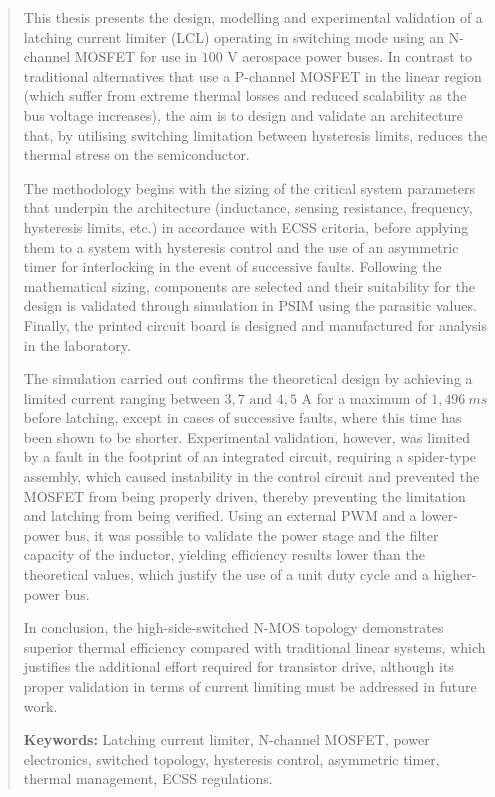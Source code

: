 \documentclass[12pt]{report} %
\begin{document}
\renewcommand\abstractname{\large\bfseries\filcenter\uppercase{Abstract}}
\begin{abstract}
\thispagestyle{plain}
This thesis presents the design, modelling and experimental validation of a latching current limiter (LCL) operating in switching mode using an N-channel MOSFET for use in $100\text{ V}$ aerospace power buses. In contrast to traditional alternatives that use a P-channel MOSFET in the linear region (which suffer from extreme thermal losses and reduced scalability as the bus voltage increases), the aim is to design and validate an architecture that, by utilising switching limitation between hysteresis limits, reduces the thermal stress on the semiconductor.

The methodology begins with the sizing of the critical system parameters that underpin the architecture (inductance, sensing resistance, frequency, hysteresis limits, etc.) in accordance with ECSS criteria, before applying them to a system with hysteresis control and the use of an asymmetric timer for interlocking in the event of successive faults. Following the mathematical sizing, components are selected and their suitability for the design is validated through simulation in PSIM using the parasitic values. Finally, the printed circuit board is designed and manufactured for analysis in the laboratory.

The simulation carried out confirms the theoretical design by achieving a limited current ranging between $3{,}7 \text{ and } 4{,}5\text{ A}$ for a maximum of $1{,}496~ms$ before latching, except in cases of successive faults, where this time has been shown to be shorter. Experimental validation, however, was limited by a fault in the footprint of an integrated circuit, requiring a spider-type assembly, which caused instability in the control circuit and prevented the MOSFET from being properly driven, thereby preventing the limitation and latching from being verified. Using an external PWM and a lower-power bus, it was possible to validate the power stage and the filter capacity of the inductor, yielding efficiency results lower than the theoretical values, which justify the use of a unit duty cycle and a higher-power bus.

In conclusion, the high-side-switched N-MOS topology demonstrates superior thermal efficiency compared with traditional linear systems, which justifies the additional effort required for transistor drive, although its proper validation in terms of current limiting must be addressed in future work.

\noindent\textbf{Keywords:} Latching current limiter, N-channel MOSFET, power electronics, switched topology, hysteresis control, asymmetric timer, thermal management, ECSS regulations.
\vfill
\end{abstract}
\end{document}
